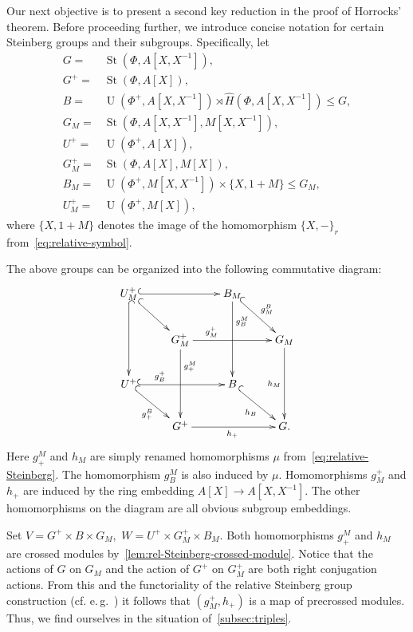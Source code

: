 \documentclass[oneside, 10pt]{amsart}
\DeclareMathOperator{\St}{St}
\DeclareMathOperator{\UU}{U}
\newcommand{\StH}{\widehat{H}}
\newcommand{\inv}{^{-1}}
\numberwithin{equation}{section}
\numberwithin{thm}{section}
\numberwithin{lemma}{section}
\theoremstyle{definition}
\theoremstyle{remark}
\begin{document}
Our next objective is to present a second key reduction in the proof of Horrocks' theorem.
Before proceeding further, we introduce concise notation for certain Steinberg groups and their subgroups.
Specifically, let
{\allowdisplaybreaks\begin{align*}
G     =& \St(\Phi, A[X, X^{-1}]),\\
G^+   =& \St(\Phi, A[X]),\\
B     =& \UU(\Phi^+, A[X, X\inv]) \rtimes \StH(\Phi, A[X, X\inv]) \leq G,\\
G_M   =& \St(\Phi, A[X, X^{-1}], M[X, X^{-1}]),\\
U^+   =& \UU(\Phi^+, A[X]),\\
G^+_M =& \St(\Phi, A[X], M[X]),\\
B_M   =& \UU(\Phi^+, M[X, X^{-1}]) \times \{X, 1+M\} \leq G_M,\\
U^+_M =& \UU(\Phi^+, M[X]),
\end{align*}}
where $\{X, 1+M\}$ denotes the image of the homomorphism $\{X, -\}_{r}$ from~\eqref{eq:relative-symbol}.

The above groups can be organized into the following commutative diagram:
\begin{equation} \label{eq:cube-Steinberg} \xymatrix{
U^+_M \ar@{^{(}->}[rr] \ar@{^{(}->}[dd] \ar@{^{(}->}[rd] &                        & B_M \ar[dd]^(.3){g_B^M} \ar@{^{(}->}[rd]^{g^B_M} &           \\
& G^+_M \ar[rr]^(.3){g^+_M} \ar^(.3){g^M_+}[dd] &                   & G_M \ar[dd]_{h_M} \\
U^+ \ar@{^{(}->}[rr]^(.3){g_B^+} \ar@{^{(}->}[rd]_{g_+^B}          &                        & B \ar@{^{(}->}[rd]_{h_B}       &           \\
& G^+ \ar[rr]_{h_+}              &                   & G.}\end{equation}
Here $g^M_+$ and $h_M$ are simply renamed homomorphisms $\mu$ from~\eqref{eq:relative-Steinberg}.
The homomorphism $g^M_B$ is also induced by $\mu$.
Homomorphisms $g_M^+$ and $h_+$ are induced by the ring embedding $A[X] \to A[X, X\inv]$.
The other homomorphisms on the diagram are all obvious subgroup embeddings.

Set $V = G^+\times B \times G_M,$ $W = U^+\times G^+_M \times B_M.$
Both homomorphisms $g_+^M$ and $h_M$ are crossed modules by~\cref{lem:rel-Steinberg-crossed-module}.
Notice that the actions of $G$ on $G_M$ and the action of $G^+$ on $G_M^+$ are both right conjugation actions.
From this and the functoriality of the relative Steinberg group construction (cf. e.\,g.~\cite[\S~3]{S15}) it follows that $(g^+_M, h_+)$ is a map of precrossed modules.
Thus, we find ourselves in the situation of~\cref{subsec:triples}.
\end{document}
